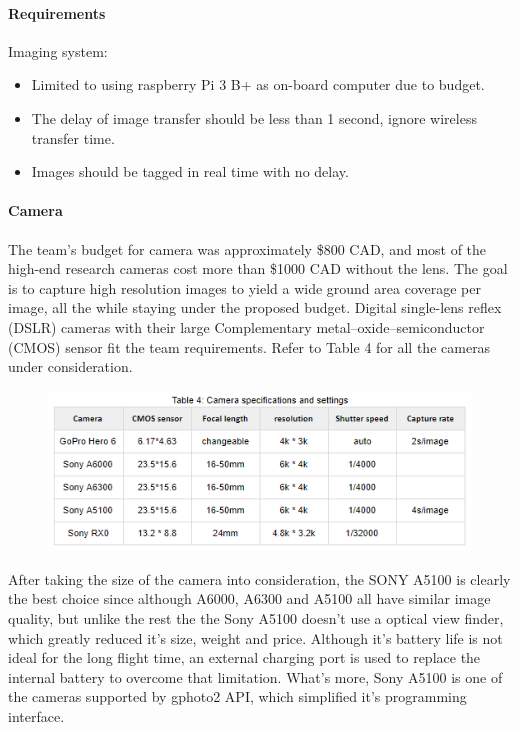 \paragraph{Requirements}
Imaging system: 
\begin{itemize}
    \item Limited to using raspberry Pi 3 B+ as on-board computer due to budget.
    \item The delay of image transfer should be less than 1 second, ignore wireless transfer time. 
    \item Images should be tagged in real time with no delay. 
\end{itemize}
\paragraph{Camera}

The team's budget for camera was approximately \$800 CAD, and most of the high-end research cameras cost more than \$1000 CAD without the lens. The goal is to capture high resolution images to yield a wide ground area coverage per image, all the while staying under the proposed budget. Digital single-lens reflex (DSLR) cameras with their large Complementary metal–oxide–semiconductor (CMOS) sensor fit the team requirements. Refer to Table 4 for all the cameras under consideration.

\begin{figure}[H]\centering
\includegraphics[width=\linewidth]{table/Table_4_camera_specs.PNG}
\caption*{}
\label{fig:cs}
\end{figure}

After taking the size of the camera into consideration, the SONY A5100 is clearly the best choice since although A6000, A6300 and A5100 all have similar image quality, but unlike the rest the the Sony A5100 doesn't use a optical view finder, which greatly reduced it's size,  weight and price. Although it's battery life is not ideal for the long flight time, an external charging port is used to replace the internal battery to overcome that limitation. What's more, Sony A5100 is one of the cameras supported by gphoto2 API, which simplified it's programming interface. 

